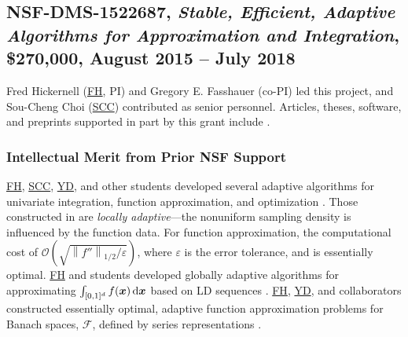 \documentclass[11pt]{NSFamsart}
\newcommand{\FH}{\hyperlink{FHlink}{FH}\xspace}
\newcommand{\SCTC}{\hyperlink{SCTClink}{SCC}\xspace}
\newcommand{\YD}{\hyperlink{YDlink}{YD}\xspace}
\newcommand{\bx}{{\boldsymbol{x}}}
\def\dif{\textup{d}}
\newcommand{\calf}{{\mathcal{F}}}
\newcommand{\norm}[2][{}]{\ensuremath{\left \lVert #2 \right \rVert}_{#1}}
\newcommand{\Order}{\mathcal{O}}
\begin{document}
\subsection{NSF-DMS-1522687, \emph{Stable, Efficient, Adaptive Algorithms for
			Approximation and Integration},
		\$270,000, August 2015 -- July 2018} \label{sec:PreviousFred}
Fred Hickernell (\FH, PI) and Gregory E. Fasshauer (co-PI) led this project, and Sou-Cheng Choi (\SCTC) contributed as senior personnel.  Articles, theses,
software, and preprints supported in
part by this
grant
include
\cite{ala_augmented_2017,
	ChoEtal17a,
	ChoEtal21a,
	Din15a,
	DinHic20a,
	GilEtal16a,
	Hic17a,
	HicJag18b,
	HicJim16a,
	HicEtal18a,
	HicEtal17a,
	HicKriWoz19a,
	RatHic19a,
	GilJim16b,
	JimHic16a,
	JohFasHic18a,
	Li16a,
	Liu17a,
	MarEtal18a,
	mccourt_stable_2017,
	MCCEtal19a,
	mishra_hybrid_2018,
	MisEtal19a,
	rashidinia_stable_2016,
	rashidinia_stable_2018,
	Zha18a,
	Zha17a,
	Zho15a,
	ZhoHic15a}.

\subsubsection{Intellectual Merit from Prior NSF Support}
\label{previousmeritsubsec}

\FH, \SCTC, \YD, and other students developed several adaptive algorithms for univariate integration, function approximation, and optimization \cite{ChoEtal17a,HicEtal14b,  Din15a, Ton14a, Zha18a}.  Those constructed in \cite{ChoEtal17a} are \emph{locally adaptive}---the nonuniform sampling density is influenced by the function data.  For function approximation, the computational cost of $\Order\left(\sqrt{\norm[1/2]{f''}/\varepsilon} \right)$, where $\varepsilon$ is the error tolerance, and is essentially optimal. 
\FH and students developed globally adaptive algorithms for approximating $\int_{[0,1]^d} f(\bx) \, \dif \bx$ based on LD sequences \cite{HicJim16a,HicEtal17a,JimHic16a}. 
\FH, \YD, and collaborators constructed essentially optimal, adaptive function approximation problems for Banach spaces, $\calf$, defined by series representations \cite{DinHic20a,DinEtal20a}.


\end{document}

